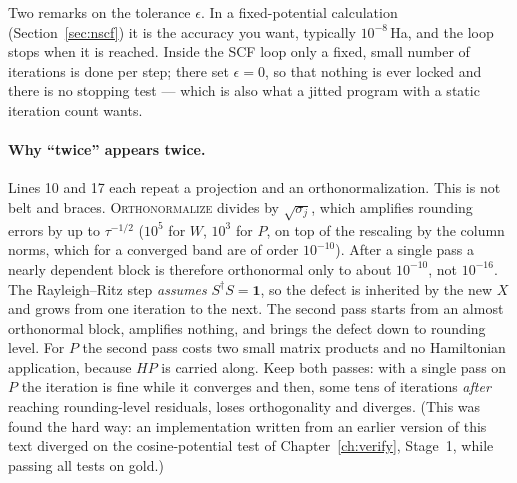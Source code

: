 Two remarks on the tolerance $\epsilon$. In a fixed-potential calculation
(Section~\ref{sec:nscf}) it is the accuracy you want, typically
$10^{-8}$\,Ha, and the loop stops when it is reached. Inside the SCF loop
only a fixed, small number of iterations is done per step; there set
$\epsilon = 0$, so that nothing is ever locked and there is no stopping
test --- which is also what a jitted program with a static iteration count
wants.

\paragraph{Why ``twice'' appears twice.} Lines 10 and 17 each repeat a
projection and an orthonormalization. This is not belt and braces.
\textsc{Orthonormalize} divides by $\sqrt{\sigma_j}$, which amplifies
rounding errors by up to $\tau^{-1/2}$ ($10^{5}$ for $W$, $10^{3}$ for
$P$, on top of the rescaling by the column norms, which for a converged
band are of order $10^{-10}$). After a single pass a nearly dependent
block is therefore orthonormal only to about $10^{-10}$, not $10^{-16}$.
The Rayleigh--Ritz step \emph{assumes} $S^\dagger S = \mathbf 1$, so the
defect is inherited by the new $X$ and grows from one iteration to the
next. The second pass starts from an almost orthonormal block, amplifies
nothing, and brings the defect down to rounding level. For $P$ the second
pass costs two small matrix products and no Hamiltonian application,
because $HP$ is carried along. Keep both passes: with a single pass on $P$
the iteration is fine while it converges and then, some tens of iterations
\emph{after} reaching rounding-level residuals, loses orthogonality and
diverges. (This was found the hard way: an implementation written from an
earlier version of this text diverged on the cosine-potential test of
Chapter~\ref{ch:verify}, Stage~1, while passing all tests on gold.)

